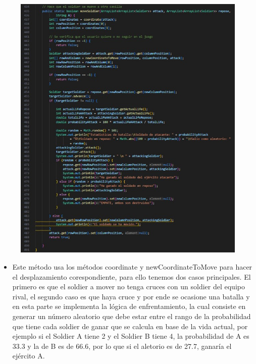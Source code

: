 \documentclass{article}
\begin{document}
	\begin{figure}[H]
		\centering
		\includegraphics[width=1\textwidth,keepaspectratio]{img/moveSoldier.jpg}
	\end{figure}
	
	
	\begin{itemize}	
		\item Este método usa los métodos coordinate y newCoordinateToMove para hacer el desplazamiento corespondiente, para ello tenemos dos casos principales. El primero es que el soldier a mover no tenga cruces con un soldier del equipo rival, el segundo caso es que haya cruce y por ende se ocasione una batalla y en esta parte se implementa la lógica de enfrentamiento, la cual consiste en generar un número aleatorio que debe estar entre el rango de la probabilidad que tiene cada soldier de ganar que se calcula en base de la vida actual, por ejemplo si el Soldier A tiene 2 y el Soldier B tiene 4, la probabilidad de A es 33.3 y la de B es de 66.6, por lo que si el aletorio es de 27.7, ganaría el ejército A.
	\end{itemize}
	
\end{document}
